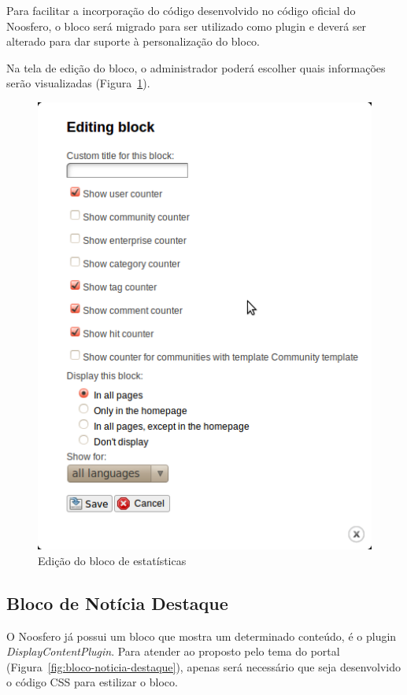 \documentclass[[a4paper,11pt]{article}
\begin{document}
Para facilitar a incorporação do código desenvolvido no código oficial
do Noosfero, o bloco será migrado para ser utilizado como plugin e
deverá ser alterado para dar suporte à
personalização do bloco.

Na tela de edição do bloco, o administrador poderá escolher quais
informações serão visualizadas
(Figura~\ref{fig:bloco-estatisticas-edicao}).

\begin{figure}[h]
\center
\includegraphics[scale=0.4]{bloco-estatisticas-edicao.png}
\caption{Edição do bloco de estatísticas}
\label{fig:bloco-estatisticas-edicao}
\end{figure}

\subsection{Bloco de Notícia Destaque}

O Noosfero já possui um bloco que mostra um determinado conteúdo, é o
plugin {\it DisplayContentPlugin}. Para atender ao proposto pelo tema do portal
(Figura~\ref{fig:bloco-noticia-destaque}), apenas será necessário que
seja desenvolvido o código CSS para estilizar o bloco.
\end{document}
